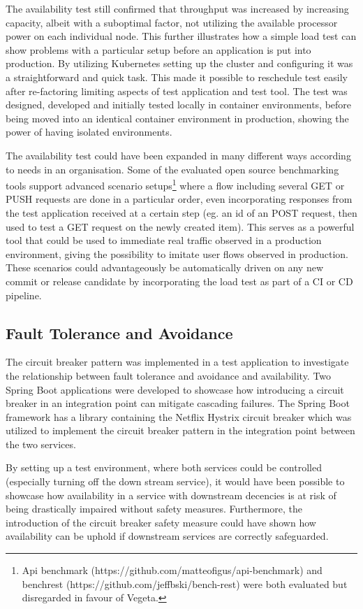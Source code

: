 The availability test still confirmed that throughput was increased by increasing capacity, albeit with a suboptimal factor, not utilizing the available processor power on each individual node. This further illustrates how a simple load test can show problems with a particular setup before an application is put into production. By utilizing Kubernetes setting up the cluster and configuring it was a straightforward and quick task. This made it possible to reschedule test easily after re-factoring limiting aspects of test application and test tool. The test was designed, developed and initially tested locally in container environments, before being moved into an identical container environment in production, showing the power of having isolated environments.

The availability test could have been expanded in many different ways according to needs in an organisation. Some of the evaluated open source benchmarking tools support advanced scenario setups\footnote{Api benchmark (https://github.com/matteofigus/api-benchmark) and benchrest (https://github.com/jeffbski/bench-rest) were both evaluated but disregarded in favour of Vegeta.} where a flow including several GET or PUSH requests are done in a particular order, even incorporating responses from the test application received at a certain step (eg. an id of an POST request, then used to test a GET request on the newly created item). This serves as a powerful tool that could be used to immediate real traffic observed in a production environment, giving the possibility to imitate user flows observed in production. These scenarios could advantageously be automatically driven on any new commit or release candidate by incorporating the load test as part of a CI or CD pipeline.

\subsection{Fault Tolerance and Avoidance}
The circuit breaker pattern was implemented in a test application to investigate the relationship between fault tolerance and avoidance and availability. Two Spring Boot applications were developed to showcase how introducing a circuit breaker in an integration point can mitigate cascading failures. The Spring Boot framework has a library containing the Netflix Hystrix circuit breaker which was utilized to implement the circuit breaker pattern in the integration point between the two services.

By setting up a test environment, where both services could be controlled (especially turning off the down stream service), it would have been possible to showcase how availability in a service with downstream decencies is at risk of being drastically impaired without safety measures. Furthermore, the introduction of the circuit breaker safety measure could have shown how availability can be uphold if downstream services are correctly safeguarded. 

